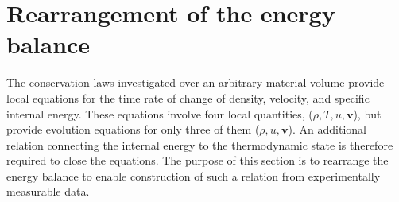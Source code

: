 
\section{Rearrangement of the energy balance}
The conservation laws investigated over an arbitrary material volume provide local equations for the time rate of change of density, velocity, and specific internal energy. These equations involve four local quantities, ($\rho,T,u,\bm v$), but provide evolution equations for only three of them ($\rho,u,\bm v$). An additional relation connecting the internal energy to the thermodynamic state is therefore required to close the equations. The purpose of this section is to rearrange the energy balance to enable construction of such a relation from experimentally measurable data.

